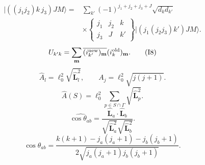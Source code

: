 \documentclass{article}
\newcommand{\ket}[1]{\lvert #1\rangle}
\begin{document}
\begin{equation}
\begin{aligned}
\ket{((j_1j_2)k\,j_3)JM}={}&\sum_{k'}(-1)^{j_1+j_2+j_3+J}\sqrt{d_kd_{k'}}\\
&\times\begin{Bmatrix}j_1&j_2&k\\j_3&J&k'\end{Bmatrix}\ket{(j_1(j_2j_3)k')JM}.
\end{aligned}
\tag{I7}
\end{equation}
\begin{equation}
U_{k'k}=\sum_{\mathbf m}\overline{(i^{\rm new}_{k'})_{\mathbf m}}(i^{\rm old}_{k})_{\mathbf m}.
\tag{I8}
\end{equation}
\begin{equation}
\hat A_l=\ell_0^2\sqrt{\hat{\mathbf L}_l^2},\qquad A_j=\ell_0^2\sqrt{j(j+1)}.
\tag{G1}
\end{equation}
\begin{equation}
\hat A(S)=\ell_0^2\sum_{p\in S\cap\Gamma}\sqrt{\hat{\mathbf L}_p^2}.
\tag{G2}
\end{equation}
\begin{equation}
\widehat{\cos\theta_{ab}}=\frac{\hat{\mathbf L}_a\cdot\hat{\mathbf L}_b}{\sqrt{\hat{\mathbf L}_a^2}\sqrt{\hat{\mathbf L}_b^2}}.
\tag{G3}
\end{equation}
\begin{equation}
\cos\theta_{ab}=\frac{k(k+1)-j_a(j_a+1)-j_b(j_b+1)}{2\sqrt{j_a(j_a+1)j_b(j_b+1)}}.
\tag{G4}
\end{equation}
\end{document}
